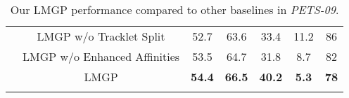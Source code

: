 \begin{table}[!hbt]
{\begin{tabular}{c|c|c|c|c|c|c}
     & LMGP w/o Tracklet Split                       & 52.7                          &   63.6                         &      33.4                     &   11.2                       & 86 \\
      & LMGP w/o Enhanced Affinities                      &         53.5                 &     64.7                     &    31.8                      &          8.7                & 82 \\
     & LMGP                      &              \textbf{54.4 }             &           \textbf{66.5}               &   \textbf{40.2}                        &  \textbf{5.3 }                       & \textbf{78}\\ 
\Xhline{2\arrayrulewidth}
\end{tabular}}
\vspace{-0.1in}
\caption{Our LMGP performance compared to other baselines in \textit{PETS-09}.}
\label{tab:pets09}
\end{table} 
\vspace{-0.2in}
